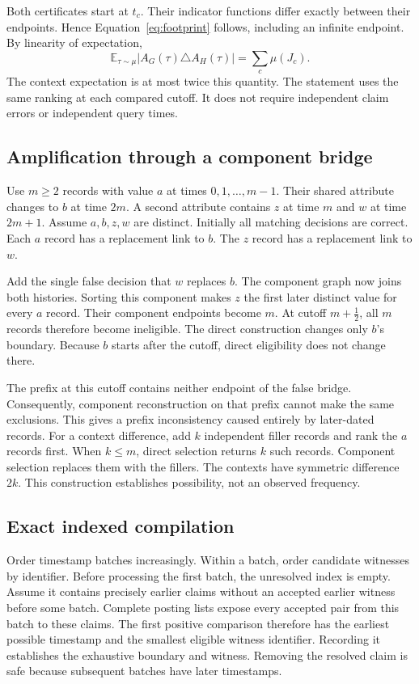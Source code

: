 Both certificates start at $t_c$.
Their indicator functions differ exactly between their endpoints.
Hence Equation~\ref{eq:footprint} follows, including an infinite endpoint.
By linearity of expectation,
\[
\mathbb E_{\tau\sim\mu}|A_G(\tau)\triangle A_H(\tau)|
=\sum_c\mu(J_c).
\]
The context expectation is at most twice this quantity.
The statement uses the same ranking at each compared cutoff.
It does not require independent claim errors or independent query times.

\subsection{Amplification through a component bridge}

Use $m\geq2$ records with value $a$ at times $0,1,\ldots,m-1$.
Their shared attribute changes to $b$ at time $2m$.
A second attribute contains $z$ at time $m$ and $w$ at time $2m+1$.
Assume $a,b,z,w$ are distinct.
Initially all matching decisions are correct.
Each $a$ record has a replacement link to $b$.
The $z$ record has a replacement link to $w$.

Add the single false decision that $w$ replaces $b$.
The component graph now joins both histories.
Sorting this component makes $z$ the first later distinct value for every $a$ record.
Their component endpoints become $m$.
At cutoff $m+\frac12$, all $m$ records therefore become ineligible.
The direct construction changes only $b$'s boundary.
Because $b$ starts after the cutoff, direct eligibility does not change there.

The prefix at this cutoff contains neither endpoint of the false bridge.
Consequently, component reconstruction on that prefix cannot make the same exclusions.
This gives a prefix inconsistency caused entirely by later-dated records.
For a context difference, add $k$ independent filler records and rank the $a$ records first.
When $k\leq m$, direct selection returns $k$ such records.
Component selection replaces them with the fillers.
The contexts have symmetric difference $2k$.
This construction establishes possibility, not an observed frequency.

\subsection{Exact indexed compilation}

Order timestamp batches increasingly.
Within a batch, order candidate witnesses by identifier.
Before processing the first batch, the unresolved index is empty.
Assume it contains precisely earlier claims without an accepted earlier witness before some batch.
Complete posting lists expose every accepted pair from this batch to these claims.
The first positive comparison therefore has the earliest possible timestamp and the smallest eligible witness identifier.
Recording it establishes the exhaustive boundary and witness.
Removing the resolved claim is safe because subsequent batches have later timestamps.

